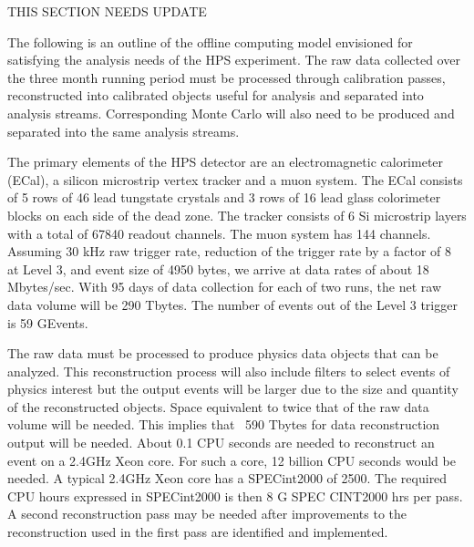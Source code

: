 

{\color{red} THIS SECTION NEEDS UPDATE}


The following is an outline of the offline computing model envisioned for satisfying the analysis needs of the HPS experiment. The raw data collected over the three month running period must be processed through calibration passes, reconstructed into calibrated objects useful for analysis and separated into analysis streams. Corresponding Monte Carlo will also need to be produced and separated into the same analysis streams.


The primary elements of the HPS detector are an electromagnetic calorimeter (ECal), a silicon microstrip vertex tracker and a muon system. The ECal consists of 5 rows of 46 lead tungstate crystals and 3 rows of 16 lead glass colorimeter blocks on each side of the dead zone. The tracker consists of 6 Si microstrip layers with a total of 67840 readout channels. The muon system has 144 channels. Assuming 30 kHz raw trigger rate, reduction of the trigger rate by a factor of 8 at Level 3, and event size of 4950 bytes, we arrive at data rates of about 18 Mbytes/sec. With 95 days of data collection for each of two runs, the net raw data volume will be 290 Tbytes. The number of events out of the Level 3 trigger is 59 GEvents.

The raw data must be processed to produce physics data objects that can be analyzed. This reconstruction process will also include filters to select events of physics interest but the output events will be larger due to the size and quantity of the reconstructed objects. Space equivalent to twice that of the raw data volume will be needed. This implies that ~590 Tbytes for data reconstruction output will be needed. About 0.1 CPU seconds are needed to reconstruct an event on a 2.4GHz Xeon core. For such a core, 12 billion CPU seconds would be needed. A typical 2.4GHz Xeon core has a SPECint2000 of 2500. The required CPU hours expressed in SPECint2000 is then 8 G SPEC CINT2000 hrs per pass. A second reconstruction pass may be needed after improvements to the reconstruction used in the first pass are identified and implemented.

